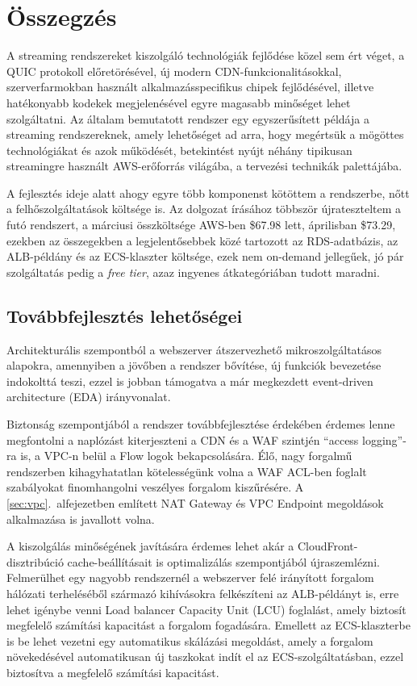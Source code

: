 \chapter{Összegzés}

A streaming rendszereket kiszolgáló technológiák fejlődése közel sem ért véget, a QUIC protokoll előretörésével, új modern CDN-funkcionalitásokkal, szerverfarmokban használt alkalmazásspecifikus chipek fejlődésével, illetve hatékonyabb kodekek megjelenésével egyre magasabb minőséget lehet szolgáltatni. Az általam bemutatott rendszer egy egyszerűsített példája a streaming rendszereknek, amely lehetőséget ad arra, hogy megértsük a mögöttes technológiákat és azok működését, betekintést nyújt néhány tipikusan streamingre használt AWS-erőforrás világába, a tervezési technikák palettájába.

A fejlesztés ideje alatt ahogy egyre több komponenst kötöttem a rendszerbe, nőtt a felhőszolgáltatások költsége is. Az dolgozat írásához többször újrateszteltem a futó rendszert, a márciusi összköltsége AWS-ben \$67.98 lett, áprilisban \$73.29, ezekben az összegekben a legjelentősebbek közé tartozott az RDS-adatbázis, az ALB-példány és az ECS-klaszter költsége, ezek nem on-demand jellegűek, jó pár szolgáltatás pedig a \emph{free tier}, azaz ingyenes átkategóriában tudott maradni.

\section{Továbbfejlesztés lehetőségei}

Architekturális szempontból a webszerver átszervezhető mikroszolgáltatásos alapokra, amennyiben a jövőben a rendszer bővítése, új funkciók bevezetése indokolttá teszi, ezzel is jobban támogatva a már megkezdett event-driven architecture (EDA)\cite{eda} irányvonalat.

Biztonság szempontjából a rendszer továbbfejlesztése érdekében érdemes lenne megfontolni a naplózást kiterjeszteni a CDN és a WAF szintjén ``access logging''-ra is, a VPC-n belül a Flow logok bekapcsolására. Élő, nagy forgalmű rendszerben kihagyhatatlan kötelességünk volna a WAF ACL-ben foglalt szabályokat finomhangolni veszélyes forgalom kiszűrésére. A \ref{sec:vpc}.~alfejezetben említett NAT Gateway és VPC Endpoint megoldások alkalmazása is javallott volna.

A kiszolgálás minőségének javítására érdemes lehet akár a CloudFront-disztribúció cache-beállításait is optimalizálás szempontjából újraszemlézni. Felmerülhet egy nagyobb rendszernél a webszerver felé irányított forgalom hálózati terheléséből származó kihívásokra felkészíteni az ALB-példányt is, erre lehet igénybe venni Load balancer Capacity Unit (LCU) foglalást, amely biztosít megfelelő számítási kapacitást a forgalom fogadására. Emellett az ECS-klaszterbe is be lehet vezetni egy automatikus skálázási megoldást, amely a forgalom növekedésével automatikusan új taszkokat indít el az ECS-szolgáltatásban, ezzel biztosítva a megfelelő számítási kapacitást.

